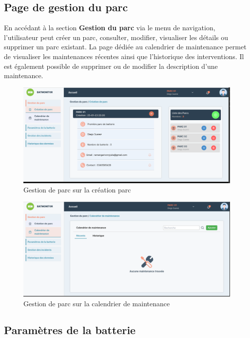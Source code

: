 \subsection{Page de gestion du parc}

En accédant à la section \textbf{Gestion du parc} via le menu de navigation, l'utilisateur peut créer un parc, consulter, modifier, visualiser les détails ou supprimer un parc existant. La page dédiée au calendrier de maintenance permet de visualiser les maintenances récentes ainsi que l'historique des interventions. Il est également possible de supprimer ou de modifier la description d'une maintenance.
 
\begin{figure}[H]
	\centering
	\includegraphics[width=17cm]{./img/Interfaces/gestionParcCreation.png}
	\caption{Gestion de parc sur la création parc}
	\label{fig:relais_5vdc}
\end{figure}


\begin{figure}[H]
	\centering
	\includegraphics[width=17cm]{./img/Interfaces/gestionParcMaintenance.png}
	\caption{Gestion de parc sur la calendrier de maintenance}
	\label{fig:relais_5vdc}
\end{figure}

\subsection{Paramètres de la batterie}

